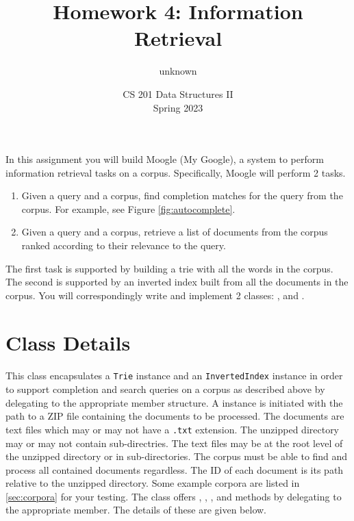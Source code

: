 \documentclass[addpoints]{exam}
\title{Homework 4: Information Retrieval}
\author{unknown}  %
\date{CS 201 Data Structures II\\Spring 2023}
\begin{document}
\maketitle



In this assignment you will build Moogle (My Google), a system to perform information retrieval tasks on a corpus. Specifically, Moogle will perform 2 tasks.
\begin{enumerate}
  \item Given a query and a corpus, find completion matches for the query from the corpus. For example, see Figure \ref{fig:autocomplete}.
  \item Given a query and a corpus, retrieve a list of documents from the corpus ranked according to their relevance to the query.
\end{enumerate}

The first task is supported by building a trie with all the words in the corpus. The second is supported by an inverted index built from all the documents in the corpus. You will correspondingly write and implement 2 classes: , and .

\section{Class Details}

\paragraph{} This class encapsulates a \texttt{Trie} instance and an \texttt{InvertedIndex} instance in order to support completion and search queries on a corpus as described above by delegating to the appropriate member structure. A  instance is initiated with the path to a ZIP file containing the documents to be processed. The documents are text files which may or may not have a \texttt{.txt} extension. The unzipped directory may or may not contain sub-directries. The text files may be at the root level of the unzipped directory or in sub-directories. The corpus must be able to find and process all contained documents regardless. The ID of each document is its path relative to the unzipped directory. Some example corpora are listed in \cref{sec:corpora} for your testing. The class offers , , , and  methods by delegating to the appropriate member. The details of these are given below.
\end{document}
